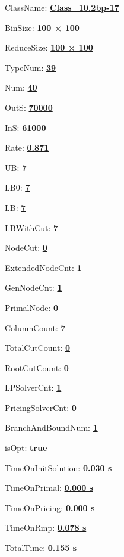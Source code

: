 \documentclass[11pt]{article}
\begin{document}
\pagestyle{empty}


ClassName: \underline{\textbf{Class_10.2bp-17}}
\par
BinSize: \underline{\textbf{100 × 100}}
\par
ReduceSize: \underline{\textbf{100 × 100}}
\par
TypeNum: \underline{\textbf{39}}
\par
Num: \underline{\textbf{40}}
\par
OutS: \underline{\textbf{70000}}
\par
InS: \underline{\textbf{61000}}
\par
Rate: \underline{\textbf{0.871}}
\par
UB: \underline{\textbf{7}}
\par
LB0: \underline{\textbf{7}}
\par
LB: \underline{\textbf{7}}
\par
LBWithCut: \underline{\textbf{7}}
\par
NodeCut: \underline{\textbf{0}}
\par
ExtendedNodeCnt: \underline{\textbf{1}}
\par
GenNodeCnt: \underline{\textbf{1}}
\par
PrimalNode: \underline{\textbf{0}}
\par
ColumnCount: \underline{\textbf{7}}
\par
TotalCutCount: \underline{\textbf{0}}
\par
RootCutCount: \underline{\textbf{0}}
\par
LPSolverCnt: \underline{\textbf{1}}
\par
PricingSolverCnt: \underline{\textbf{0}}
\par
BranchAndBoundNum: \underline{\textbf{1}}
\par
isOpt: \underline{\textbf{true}}
\par
TimeOnInitSolution: \underline{\textbf{0.030 s}}
\par
TimeOnPrimal: \underline{\textbf{0.000 s}}
\par
TimeOnPricing: \underline{\textbf{0.000 s}}
\par
TimeOnRmp: \underline{\textbf{0.078 s}}
\par
TotalTime: \underline{\textbf{0.155 s}}
\par
\newpage


\end{document}
